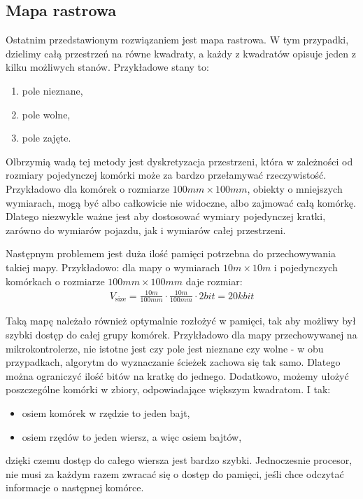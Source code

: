         \subsection{Mapa rastrowa}
            Ostatnim przedstawionym rozwiązaniem jest mapa rastrowa.
            W tym przypadki, dzielimy całą przestrzeń na równe kwadraty, a każdy z kwadratów opisuje jeden z kilku możliwych stanów.
            Przykładowe stany to:
            \begin{enumerate}
                \item pole nieznane,
                \item pole wolne,
                \item pole zajęte. 
            \end{enumerate}

            Olbrzymią wadą tej metody jest dyskretyzacja przestrzeni, która w zależności od rozmiary pojedynczej komórki może za bardzo przełamywać rzeczywistość.
            Przykładowo dla komórek o rozmiarze $100mm \times 100mm$, obiekty o mniejszych wymiarach, mogą być albo całkowicie nie widoczne, albo zajmować całą komórkę.
            Dlatego niezwykle ważne jest aby dostosować wymiary pojedynczej kratki, zarówno do wymiarów pojazdu, jak i wymiarów całej przestrzeni.

            Następnym problemem jest duża ilość pamięci potrzebna do przechowywania takiej mapy.
            Przykładowo: dla mapy o wymiarach $10m \times 10m$ i pojedynczych komórkach o rozmiarze $100mm \times 100mm$ daje rozmiar:
            \begin{gather}
                V_{\text{size}} = \frac{10m}{100mm} \cdot \frac{10m}{100mm} \cdot 2bit = 20kbit
            \end{gather}

            Taką mapę należało również optymalnie rozłożyć w pamięci, tak aby możliwy był szybki dostęp do całej grupy komórek.
            Przykładowo dla mapy przechowywanej na mikrokontrolerze, nie istotne jest czy pole jest nieznane czy wolne - w obu przypadkach, algorytm do wyznaczanie ścieżek zachowa się tak samo.
            Dlatego można ograniczyć ilość bitów na kratkę do jednego.
            Dodatkowo, możemy ułożyć poszczególne komórki w zbiory, odpowiadające większym kwadratom.
            I tak:
            \begin{itemize}[label = -]
                \item osiem komórek w rzędzie to jeden bajt,
                \item osiem rzędów to jeden wiersz, a więc osiem bajtów,
            \end{itemize}
            dzięki czemu dostęp do całego wiersza jest bardzo szybki.
            Jednoczesnie procesor, nie musi za każdym razem zwracać się o dostęp do pamięci, jeśli chce odczytać informacje o następnej komórce.

